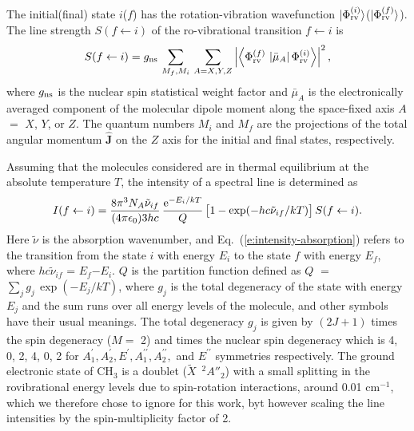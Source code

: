\documentclass{achemso}
\renewcommand{\eqref}[1]{(\ref{#1})}
\newcommand{\red}[1]{{\color{red} #1}}
\newcommand{\3}{$_{3}$}
\newcommand{\cm}{cm$^{-1}$}
\newcommand{\p}{^\prime}
\newcommand{\pp}{^{\prime\prime}}
\begin{document}
The initial(final) state $i$($f$) has the rotation-vibration wavefunction $\vert \Phi_{\rm rv}^{(i)}
\rangle$($\vert \Phi_{\rm rv}^{(f)} \rangle$).
The line strength\cite{dipole05,mss,fms} $S(f\leftarrow i)$ of the ro-vibrational transition
$f \leftarrow i$ is
\begin{equation}
\label{e:linestrength_deg}
S(f \leftarrow i) =
g_{\rm ns} \,
\sum_{M_f, M_i} \,
\sum_{A=X,Y,Z}
\left\vert  \left\langle
\Phi_{\rm rv}^{(f)} \,
\left\vert
\bar\mu_A \right\vert
\Phi_{\rm rv}^{(i)}
\right\rangle \right\vert^2 \hbox{,}
\end{equation}
where $g_{\rm ns}$ is the nuclear spin statistical weight factor\cite{mss} and $\bar\mu_A$
is the electronically averaged component of the molecular dipole moment along the space-fixed axis\cite{mss}
$A$ $=$ $X$, $Y$, or $Z$. The quantum numbers $M_i$ and $M_f$ are the projections of the total angular
momentum $\hat{\mathbf{J}}$ on the $Z$ axis for the initial and final states, respectively.

Assuming that the molecules considered are in thermal equilibrium at the absolute temperature $T$,
the intensity of a spectral line  is determined as
\begin{equation}
\label{e:intensity-absorption}
I(f \leftarrow i)  =
    \frac{8 \pi^3 N_A \tilde\nu_{if}}{(4 \pi \epsilon_0)3hc} \,
    \frac{{\rm e}^{-E_i/kT}}{Q} \,
    \big[1 - {\rm exp}(-hc\tilde\nu_{if}/kT)\big] \,
    S(f \leftarrow i).
\end{equation}
Here $\tilde{\nu}$ is the absorption wavenumber, and Eq.~\eqref{e:intensity-absorption} refers to the
transition from the state $i$ with energy $E_i$ to the state $f$ with energy $E_f$, where
$hc\tilde\nu_{if}$ = $E_f$$-$$E_i$. $Q$ is the partition function defined as $Q$ $=$ $\sum_j g_j \,
\exp (  -E_j/kT)$, where $g_j$ is the total degeneracy of the state with energy $E_j$ and
the sum runs over all energy levels of the molecule, and other symbols
have their usual meanings. The total degeneracy $g_j$ is given by
$(2J+1)$ times the spin degeneracy ($M = $ 2) and times the nuclear spin degeneracy which is 4, 0, 2, 4, 0, 2
for $A_1\p, A_2\p, E\p, A_1\pp, A_2\pp,$ and $E\pp$ symmetries respectively. The ground electronic
state of CH$_3$ is a doublet  ($\tilde{X}$~$^2A''_2$) with a small splitting\cite{nu2_82c,nu3_97b}
in the rovibrational energy levels due to spin-rotation interactions, around 0.01 \cm, which we
therefore chose to ignore for this work, byt however scaling the line intensities by the spin-multiplicity factor of 2.
\end{document}
